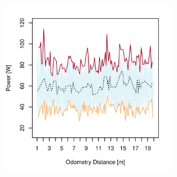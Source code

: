 \begin{figure}[h]
\captionsetup[subfigure]{justification=centering}
\vspace{-2ex}
	\centering
    \setlength{\subfigureWidth}{0.50\textwidth}
    \setlength{\graphicsHeight}{80mm}
    \hypersetup{hidelinks=true}%
    \begin{subfigure}[t]{\subfigureWidth}
        \centering
        \includegraphics[height=\graphicsHeight]{sections/design/power-budget/plots/locomotion-power-draw-on-flat-terrain-1.png}
        \label{fig:plot:sub:sherpatt-flat-terrain-power-draw-1}
    \end{subfigure}\hfill
    \begin{subfigure}[t]{\subfigureWidth}
        \centering

\end{subfigure}
\end{figure}
